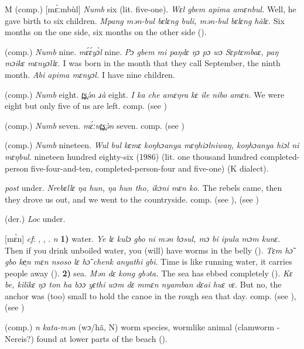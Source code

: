 \begin{letter}{M}
 (comp.) [mɛ́ːmbùl] \textit{Numb} six (lit. five-one). \textit{Wɛl gbem apima amɛnbul.} Well, he gave birth to six children. \textit{Mpang mən-bul bɛlɛng buli, mən-bul bɛlɛng hãlɛ.} Six months on the one side, six months on the other side (\citealt{Pichl1967}). 

 (comp.) \textit{Numb} nine. \textit{mɛ́ɛ́yɔ̀l} nine. \textit{Pɔ gbem mi paŋdɛ ŋɔ pɔ wɔ Sɛptɛmbaɛ, paŋ mɔikɛ mɛnyɔllɛ.} I was born in the month that they call September, the ninth month. \textit{Abi apima mɛnyɔl.} I have nine children.

 (comp.) \textit{Numb} eight. \textit{t̪s̪ə́n ɹà} eight. \textit{I ka che amɛŋra kɛ ile nibo amɛn.} We were eight but only five of us are left. comp.  (see )

 (comp.) \textit{Numb} seven. \textit{mɛ́ːnt̪s̪ə̀n} seven. comp.  (see )

 (comp.) \textit{Numb} nineteen. \textit{Wul bul kɛmɛ koŋhɔanya mɛŋhiɔlniwaŋ, koŋhɔanya hiɔl ni mɛŋbul.} nineteen hundred eighty-six (1986) (lit. one thousand hundred completed-person five-four-and-ten, completed-person-four and five-one) (K dialect). 

 \textit{post} under. \textit{Nrebɛllɛ ŋa hun, ŋa hun tho, ikɔni mɛn ko.} The rebels came, then they drove us out, and we went to the countryside. comp.  (see ),  (see ) 

 (der.) \textit{Loc} under.

 [mɛ̀n] \textit{cf}: , , . \textit{n} \textbf{1)} water. \textit{Ye lɛ kulɔ gbo ni mən bɔsul, mɔ bi ipula mɔm kunɛ.} Then if you drink unboiled water, you (will) have worms in the belly (\citealt{Pichl1967}). \textit{Tɛm hɔ̃ gbo ke̹n mɛn nsoso lɛ hɔ̃ chenk anyathi gbi}. Time is like running water, it carries people away (\citealt{Pichl1967}). \textbf{2)} sea. \textit{Mən dɛ kong gbəta.} The sea has ebbed completely (\citealt{Pichl1967}). \textit{Kɛ be, kilikɛ ŋɔ ton ha bɔɔ yɛthi wɔm dɛ mmɛn nyamban dɛai huɛ vɛ.} But no, the anchor was (too) small to hold the canoe in the rough sea that day. comp.  (see ),  (see ) 

 (comp.) \textit{n} \textit{kata-mən} (wɔ/hã, N) worm species, wormlike animal (clamworm - Nereis?) found at lower parts of the beach (\citealt{Pichl1967}).


\end{letter}
